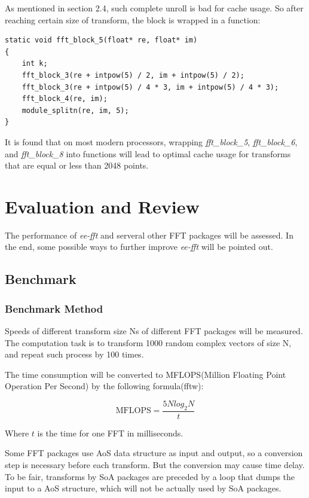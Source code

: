 \documentclass[a4paper]{report}
\begin{document}
	As mentioned in section 2.4, such complete unroll is bad for cache usage. So after reaching certain size of transform, the block is wrapped in a function:
	
    \lstset{language = c, tabsize = 4}
    \begin{lstlisting}
static void fft_block_5(float* re, float* im)
{
    int k;
    fft_block_3(re + intpow(5) / 2, im + intpow(5) / 2);
    fft_block_3(re + intpow(5) / 4 * 3, im + intpow(5) / 4 * 3);
    fft_block_4(re, im);
    module_splitn(re, im, 5);
}
    \end{lstlisting}
	
	It is found that on most modern processors, wrapping \textit{fft\_block\_5}, \textit{fft\_block\_6}, and \textit{fft\_block\_8} into functions will lead to optimal cache usage for transforms that are equal or less than 2048 points.

\chapter{Evaluation and Review} \indent

	The performance of \textit{ee-fft} and serveral other FFT packages will be assessed. In the end, some possible ways to further improve \textit{ee-fft} will be pointed out.

\section{Benchmark} \indent

\subsection{Benchmark Method} \indent

	Speeds of different transform size Ns of different FFT packages will be measured. The computation task is to transform 1000 random complex vectors of size N, and repeat such process by 100 times.
	
	The time consumption will be converted to MFLOPS(Million Floating Point Operation Per Second) by the following formula(fftw):
	
	\[\text{MFLOPS} = \frac{5Nlog_2N}{t}\]
	
	Where $t$ is the time for one FFT in milliseconds.
	
	Some FFT packages use AoS data structure as input and output, so a conversion step is necessary before each transform. But the conversion may cause time delay. To be fair, transforms by SoA packages are preceded by a loop that dumps the input to a AoS structure, which will not be actually used by SoA packages.
\end{document}
